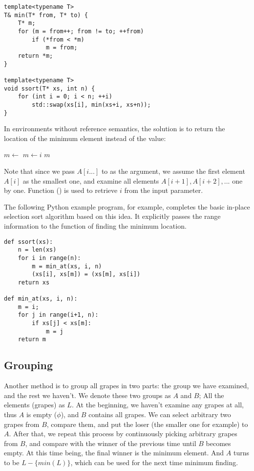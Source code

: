 \documentclass{article}
\begin{document}
\lstset{language=C++}
\begin{lstlisting}
template<typename T>
T& min(T* from, T* to) {
    T* m;
    for (m = from++; from != to; ++from)
        if (*from < *m)
            m = from;
    return *m;
}

template<typename T>
void ssort(T* xs, int n) {
    for (int i = 0; i < n; ++i)
        std::swap(xs[i], min(xs+i, xs+n));
}
\end{lstlisting}

In environments without reference semantics, the solution is to return the location
of the minimum element instead of the value:

\begin{algorithmic}
  \State $m \gets$ 
      \State $m \gets i$
    \EndIf
  \EndFor
  \State \Return $m$
\EndFunction
\end{algorithmic}

Note that since we pass $A[i...]$ to  as the argument, we assume the first
element $A[i]$ as the smallest one, and examine all elements $A[i+1], A[i+2], ...$ one by one.
Function () is used to retrieve $i$ from the input parameter.

The following Python example program, for example, completes the basic in-place
selection sort algorithm based on this idea. It explicitly passes the range information
to the function of finding the minimum location.

\lstset{language=Python}
\begin{lstlisting}
def ssort(xs):
    n = len(xs)
    for i in range(n):
        m = min_at(xs, i, n)
        (xs[i], xs[m]) = (xs[m], xs[i])
    return xs

def min_at(xs, i, n):
    m = i;
    for j in range(i+1, n):
        if xs[j] < xs[m]:
            m = j
    return m
\end{lstlisting}

\subsection{Grouping}
Another method is to group all grapes in two parts: the group we have examined, and the rest we
haven't. We denote these two groups as $A$ and $B$; All the elements (grapes) as $L$.
At the beginning, we haven't examine any grapes at all, thus $A$ is empty ($\phi$), and
$B$ contains all grapes. We can select arbitrary two grapes from $B$, compare them, and
put the loser (the smaller one for example) to $A$. After that, we repeat this process
by continuously picking arbitrary grapes from $B$, and compare with the winner of the
previous time until $B$ becomes empty. At this time being, the final winner is the
minimum element. And $A$ turns to be $L - \{min(L)\}$, which can be used for the next
time minimum finding.
\end{document}
